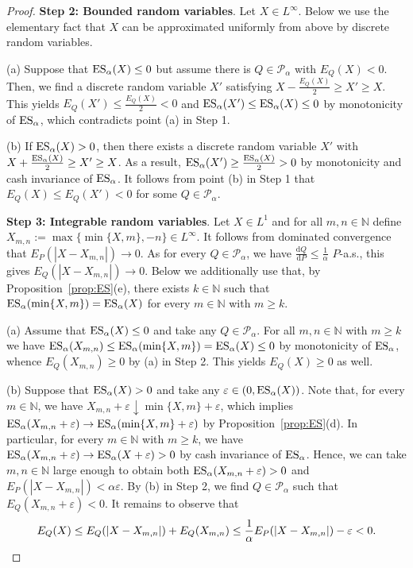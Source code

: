 \documentclass[12pt]{article}
\theoremstyle{plain}
\theoremstyle{definition}
\theoremstyle{remark}
\numberwithin{equation}{section}
\newcommand{\E}{E}
\newcommand{\probp}{P}
\newcommand{\probq}{Q}
\newcommand{\N}{\mathbb{N}}
\newcommand{\Q}{Q}
\newcommand{\cP}{\mathcal{P}}
\newcommand{\ES}{\mathop {\rm ES}\nolimits}
\newcommand{\diff}{\mathrm{d}}
\begin{document}
\begin{proof}
\smallskip

{\bf Step 2: Bounded random variables}. Let $X\in L^\infty$. Below we use the elementary fact that $X$ can be approximated uniformly from above by discrete random variables.

(a) Suppose that $\ES_\alpha(X)\le0$ but assume there is $\probq \in \cP_\alpha$ with $\E_\probq(X) < 0$. Then, we find a discrete random variable $X'$ satisfying $X-\frac{\E_\probq(X)}{2} \geq  X' \geq X$. This yields $\E_\probq(X') \leq \frac{\E_\probq(X)}{2} < 0$ and $\ES_\alpha(X') \leq \ES_\alpha(X) \leq 0$ by monotonicity of $\ES_\alpha$, which contradicts point (a) in Step 1.

(b) If $\ES_\alpha(X)>0$, then there exists a discrete random variable $X'$ with $X+\frac{\ES_\alpha(X)}{2} \geq  X' \geq X$. As a result, $\ES_\alpha(X') \geq \frac{\ES_\alpha(X)}{2} > 0$ by monotonicity and cash invariance of $\ES_\alpha$. It follows from point (b) in Step 1 that $\E_\probq(X) \leq \E_\probq(X')< 0$ for some $\probq \in \cP_\alpha$.

\medskip

{\bf Step 3: Integrable random variables}. Let $X\in L^1$ and for all $m,n\in\N$ define $X_{m,n}:=\max\{\min\{X,m\},-n\}\in L^\infty$. It follows from dominated convergence that $\E_\probp(|X-X_{m,n}|)\to0$. As for every $\probq\in\cP_\alpha$, we have $\frac{\diff \Q}{\diff P}\le\frac{1}{\alpha}$ $\probp$-a.s., this gives $\E_\probq(|X-X_{m,n}|)\to0$. Below we additionally use that, by Proposition~\ref{prop:ES}(e), there exists $k\in\N$ such that $\ES_\alpha(\min\{X,m\})=\ES_\alpha(X)$ for every $m\in\N$ with $m\ge k$.

(a) Assume that $\ES_\alpha(X)\le0$ and take any $\probq\in\cP_\alpha$. For all $m,n\in\N$ with $m\ge k$ we have $\ES_\alpha(X_{m,n})\le\ES_\alpha(\min\{X,m\})=\ES_\alpha(X)\le0$ by monotonicity of $\ES_\alpha$, whence $\E_\probq(X_{m,n})\ge0$ by (a) in Step 2. This yields $\E_\probq(X)\ge0$ as well.

(b) Suppose that $\ES_\alpha(X)>0$ and take any $\varepsilon\in(0,\ES_\alpha(X))$. Note that, for every $m\in\N$, we have $X_{m,n}+\varepsilon\downarrow \min\{X,m\}+\varepsilon$, which implies $\ES_\alpha(X_{m,n}+\varepsilon)\to\ES_\alpha(\min\{X,m\}+\varepsilon)$ by Proposition~\ref{prop:ES}(d). In particular, for every $m\in\N$ with $m\ge k$, we have $\ES_\alpha(X_{m,n}+\varepsilon)\to\ES_\alpha(X+\varepsilon)>0$ by cash invariance of $\ES_\alpha$. Hence, we can take $m,n\in\N$ large enough to obtain both $\ES_\alpha(X_{m,n}+\varepsilon)>0$ and $\E_\probp(|X-X_{m,n}|)<\alpha\varepsilon$. By (b) in Step 2, we find $\probq\in\cP_\alpha$ such that $\E_\probq(X_{m,n}+\varepsilon)<0$. It remains to observe that
\[
\E_\probq(X) \le \E_\probq(|X-X_{m,n}|)+\E_\probq(X_{m,n}) \le \frac{1}{\alpha}\E_\probp(|X-X_{m,n}|)-\varepsilon < 0.\qedhere
\]
\end{proof}
\end{document}
